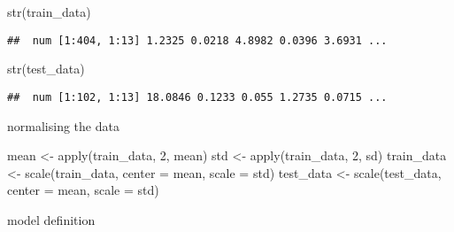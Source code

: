 \documentclass[
]{article}
\newenvironment{Shaded}{\begin{snugshade}}{\end{snugshade}}
\newcommand{\AttributeTok}[1]{\textcolor[rgb]{0.77,0.63,0.00}{#1}}
\newcommand{\DecValTok}[1]{\textcolor[rgb]{0.00,0.00,0.81}{#1}}
\newcommand{\FunctionTok}[1]{\textcolor[rgb]{0.00,0.00,0.00}{#1}}
\newcommand{\NormalTok}[1]{#1}
\newcommand{\OtherTok}[1]{\textcolor[rgb]{0.56,0.35,0.01}{#1}}
\begin{document}
\begin{Shaded}
\begin{Highlighting}[]
\FunctionTok{str}\NormalTok{(train\_data)}
\end{Highlighting}
\end{Shaded}

\begin{verbatim}
##  num [1:404, 1:13] 1.2325 0.0218 4.8982 0.0396 3.6931 ...
\end{verbatim}

\begin{Shaded}
\begin{Highlighting}[]
\FunctionTok{str}\NormalTok{(test\_data)}
\end{Highlighting}
\end{Shaded}

\begin{verbatim}
##  num [1:102, 1:13] 18.0846 0.1233 0.055 1.2735 0.0715 ...
\end{verbatim}

normalising the data

\begin{Shaded}
\begin{Highlighting}[]
\NormalTok{mean }\OtherTok{\textless{}{-}} \FunctionTok{apply}\NormalTok{(train\_data, }\DecValTok{2}\NormalTok{, mean)  }
\NormalTok{std }\OtherTok{\textless{}{-}} \FunctionTok{apply}\NormalTok{(train\_data, }\DecValTok{2}\NormalTok{, sd)}
\NormalTok{train\_data }\OtherTok{\textless{}{-}} \FunctionTok{scale}\NormalTok{(train\_data, }\AttributeTok{center =}\NormalTok{ mean, }\AttributeTok{scale =}\NormalTok{ std) }
\NormalTok{test\_data }\OtherTok{\textless{}{-}} \FunctionTok{scale}\NormalTok{(test\_data, }\AttributeTok{center =}\NormalTok{ mean, }\AttributeTok{scale =}\NormalTok{ std)}
\end{Highlighting}
\end{Shaded}

model definition
\end{document}
